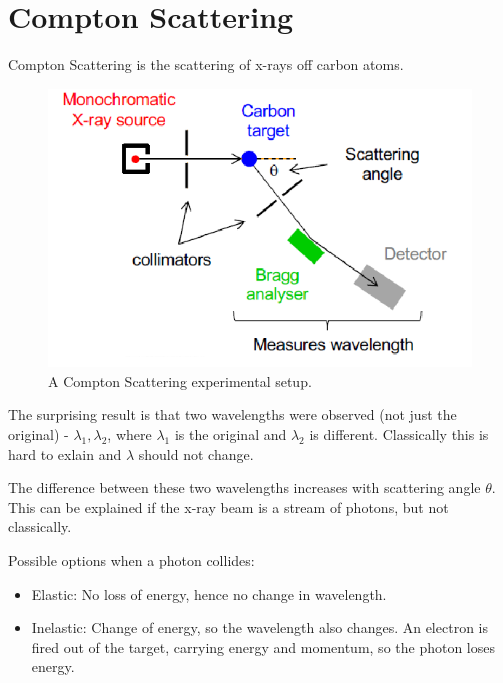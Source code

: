 \section*{Compton Scattering}
Compton Scattering is the scattering of x-rays off carbon atoms.

\begin{figure}[H]
    \centering
    \includegraphics{figures/lec03-06.png}
     \caption{A Compton Scattering experimental setup.}
\end{figure}

The surprising result is that two wavelengths were observed (not just the original) - $\lambda_1, \lambda_2$, where $\lambda_1$ is the original and $\lambda_2$ is different. Classically this is hard to exlain and $\lambda$ should not change.

The difference between these two wavelengths increases with scattering angle $\theta$. This can be explained if the x-ray beam is a stream of photons, but not classically.

Possible options when a photon collides:
\begin{itemize}
    \item Elastic: No loss of energy, hence no change in wavelength.
    \item Inelastic: Change of energy, so the wavelength also changes. An electron is fired out of the target, carrying energy and momentum, so the photon loses energy.
\end{itemize}

